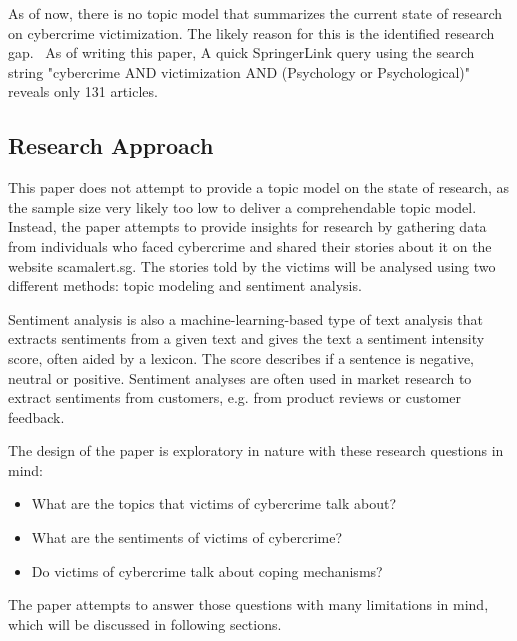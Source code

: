 \bigskip

As of now, there is no topic model that summarizes the current state of research on cybercrime victimization. The likely reason for this is the identified research gap.~\citep{horesearch} As of writing this paper, A quick SpringerLink query using the search string "cybercrime AND victimization AND (Psychology or Psychological)" reveals only 131 articles.

\subsection{Research Approach}

This paper does not attempt to provide a topic model on the state of research, as the sample size very likely too low to deliver a comprehendable topic model. 
Instead, the paper attempts to provide insights for research by gathering data from individuals who faced cybercrime and shared their stories about it on the website scamalert.sg. The stories told by the victims will be analysed using two different methods: topic modeling and sentiment analysis.

Sentiment analysis is also a machine-learning-based type of text analysis that extracts sentiments from a given text and gives the text a sentiment intensity score, often aided by a lexicon. The score describes if a sentence is negative, neutral or positive. Sentiment analyses are often used in market research to extract sentiments from customers, e.g. from product reviews or customer feedback.~\cite{rambocas2013marketing}

\bigskip

The design of the paper is exploratory in nature with these research questions in mind:

\begin{itemize}
    \item What are the topics that victims of cybercrime talk about?
    \item What are the sentiments of victims of cybercrime?
    \item Do victims of cybercrime talk about coping mechanisms?
\end{itemize}


The paper attempts to answer those questions with many limitations in mind, which will be discussed in following sections.